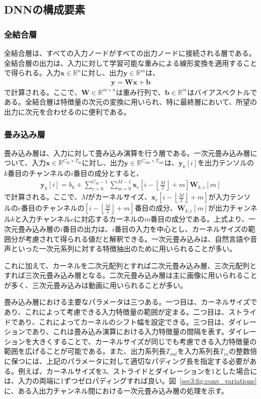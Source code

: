 \documentclass[12pt]{jarticle}
\numberwithin{equation}{section}    %
\numberwithin{figure}{section}      %
\numberwithin{table}{section}      %
\begin{document}
\subsection{DNNの構成要素}
\subsubsection{全結合層}
全結合層は、すべての入力ノードがすべての出力ノードに接続される層である。全結合層の出力は、入力に対して学習可能な重みによる線形変換を適用することで得られる。入力$\bm{x} \in \mathbb{R}^{n}$に対し、出力$\bm{y} \in \mathbb{R}^{m}$は、
\begin{align}
    \bm{y} = \bm{W}\bm{x} + \bm{b}
\end{align}
で計算される。ここで、$\bm{W} \in \mathbb{R}^{m \times n}$は重み行列で、$\bm{b} \in \mathbb{R}^{m}$はバイアスベクトルである。全結合層は特徴量の次元の変換に用いられ、特に最終層において、所望の出力に次元を合わせるのに便利である。

\subsubsection{畳み込み層}
畳み込み層は、入力に対して畳み込み演算を行う層である。一次元畳み込み層について、入力$\bm{x} \in \mathbb{R}^{C_{\text{in}} \times T_{\text{in}}}$に対し、出力$\bm{y} \in \mathbb{R}^{C_{\text{out}} \times T_{\text{out}}}$は、$\bm{y}_{k}[i]$を出力テンソルの$k$番目のチャンネルの$i$番目の成分とすると、
\begin{align}
    \bm{y}_{k}[i] = b_{k} + \sum_{c=0}^{C_{\text{in}} - 1} \sum_{m = 0}^{M - 1} \bm{x}_{c}\left[i - \left\lfloor \frac{M}{2} \right\rfloor + m\right] \bm{W}_{k, c}[m]
\end{align}
で計算される。ここで、$M$がカーネルサイズ、$\bm{x}_{c}\left[i - \left\lfloor \frac{M}{2} \right\rfloor + m\right]$が入力テンソルの$c$番目のチャンネルの$\left[i - \left\lfloor \frac{M}{2} \right\rfloor + m\right]$番目の成分、$\bm{W}_{k, c}[m]$が出力チャンネル$k$と入力チャンネル$c$に対応するカーネルの$m$番目の成分である。上式より、一次元畳み込み層の$i$番目の出力は、$i$番目の入力を中心とし、カーネルサイズの範囲分が考慮されて得られる値だと解釈できる。一次元畳み込みは、自然言語や音声といった一次元系列に対する特徴抽出のために用いられることが多い。

これに加えて、カーネルを二次元配列とすれば二次元畳み込み層、三次元配列とすれば三次元畳み込み層となる。二次元畳み込み層は主に画像に用いられることが多く、三次元畳み込みは動画に用いられることが多い。

畳み込み層における主要なパラメータは三つある。一つ目は、カーネルサイズであり、これによって考慮できる入力特徴量の範囲が定まる。二つ目は、ストライドであり、これによってカーネルのシフト幅を設定できる。三つ目は、ダイレーションであり、これは畳み込み演算における入力特徴量の間隔を表す。ダイレーションを大きくすることで、カーネルサイズが同じでも考慮できる入力特徴量の範囲を広げることが可能である。また、出力系列長$T_{out}$を入力系列長$T_{in}$の整数倍に保つには、上記のパラメータに対して適切なパディング長を指定する必要がある。例えば、カーネルサイズを3、ストライドとダイレーションを1とした場合には、入力の両端に1ずつゼロパディングすれば良い。図~\ref{sec3:fig:conv_variations}に、ある入出力チャンネル間における一次元畳み込み層の処理を示す。
\end{document}
